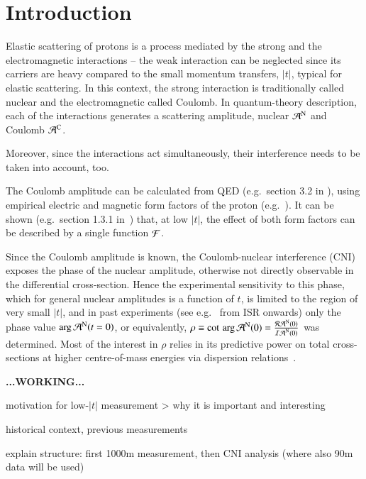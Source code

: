 \section{Introduction}
%
Elastic scattering of protons is a process mediated by the strong and the electromagnetic interactions -- the weak interaction can be neglected since its carriers are heavy compared to the small momentum transfers, $|t|$, typical for elastic scattering. In this context, the strong interaction is traditionally called nuclear and the electromagnetic called Coulomb. In quantum-theory description, each of the interactions generates a scattering amplitude, nuclear ${\cal A}^{\rm N}$ and Coulomb ${\cal A}^{\rm C}$. 

Moreover, since the interactions act simultaneously, their interference needs to be taken into account, too. 

The Coulomb amplitude can be calculated from QED (e.g.~section 3.2 in \cite{block06}), using empirical electric and magnetic form factors of the proton (e.g.~\cite{puckett10}). It can be shown (e.g.~section 1.3.1 in~\cite{jan_thesis}) that, at low $|t|$, the effect of both form factors can be described by a single function ${\cal F}$. 


Since the Coulomb amplitude is known, the Coulomb-nuclear interference (CNI) exposes the phase of the nuclear amplitude, otherwise not directly observable in the differential cross-section. Hence the experimental sensitivity to 
this phase, which for general nuclear amplitudes is a function of $t$, is 
limited to the region of very small $|t|$, and in past 
experiments (see e.g.~\cite{} from ISR onwards) 
only the phase value $\arg {\cal A}^{\rm N} (t=0)$, or
equivalently, $\rho \equiv \cot \, \arg {\cal A}^{\rm N} (0) = \frac{{\cal R A}^{\rm N} (0)}{{\cal I A}^{\rm N} (0)}$ was determined. 
Most of the interest in $\rho$ relies in its predictive power on total 
cross-sections at higher centre-of-mass energies via dispersion 
relations~\cite{dremin-dispersion}. 

\textbf{...WORKING...}


 


\> motivation for low-$|t|$ measurement
\>> why it is important and interesting

\> historical context, previous measurements

\> explain structure: first 1000m measurement, then CNI analysis (where also 90m data will be used)
